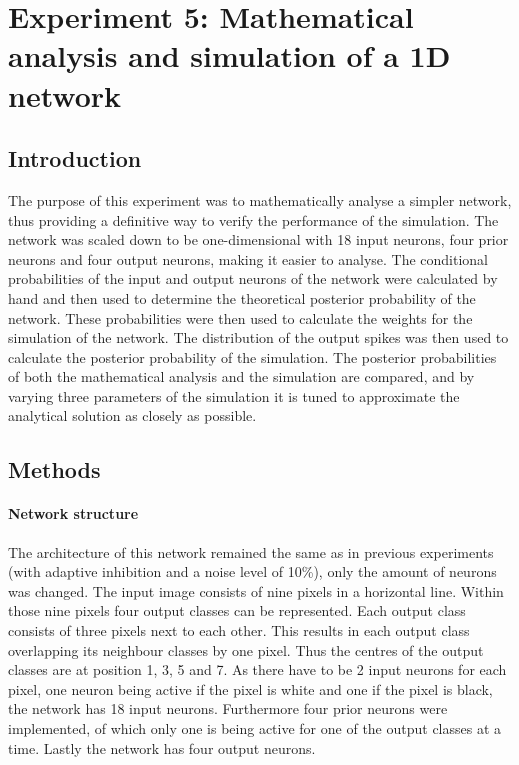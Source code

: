 \section{Experiment 5: Mathematical analysis and simulation of a 1D network}
\label{section:1D}

\subsection{Introduction}

The purpose of this experiment was to mathematically analyse a simpler network, thus providing a definitive way to verify the performance of the simulation. The network was scaled down to be one-dimensional with 18 input neurons, four prior neurons and four output neurons, making it easier to analyse. The conditional probabilities of the input and output neurons of the network  were calculated by hand and then used to determine the theoretical posterior probability of the network. These probabilities were then used to calculate the weights for the simulation of the network. The distribution of the output spikes was then used to calculate the posterior probability of the simulation. The posterior probabilities of both the mathematical analysis and the simulation are compared, and by varying three parameters of the simulation it is tuned to approximate the analytical solution as closely as possible.

\subsection{Methods}

\paragraph{Network structure}
The architecture of this network remained the same as in previous experiments (with adaptive inhibition and a noise level of 10\%), only the amount of neurons was changed. The input image consists of nine pixels in a horizontal line. Within those nine pixels four output classes can be represented. Each output class consists of three pixels next to each other. This results in each output class overlapping its neighbour classes by one pixel. Thus the centres of the output classes are at position 1, 3, 5 and 7.    As there have to be 2 input neurons for each pixel, one neuron being active if the pixel is white and one if the pixel is black, the network has 18 input neurons. Furthermore four prior neurons were implemented, of which only one is being active for one of the output classes at a time. Lastly the network has four output neurons.

